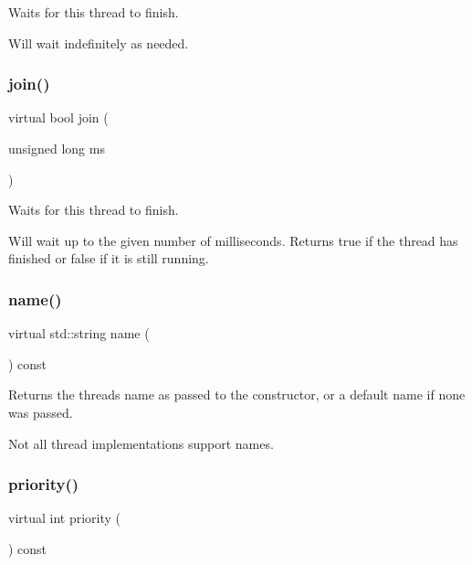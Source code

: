 Waits for this thread to finish. 

Will wait indefinitely as needed. \mbox{\label{classGThread_aeaa664c96a0ace02d44fc791725550a2}} 
\subsubsection{\texorpdfstring{join()}{join()}\hspace{0.1cm}{\footnotesize\ttfamily [2/2]}}
{\footnotesize\ttfamily virtual bool join (\begin{DoxyParamCaption}\item[{unsigned long}]{ms }\end{DoxyParamCaption})\hspace{0.3cm}{\ttfamily [pure virtual]}}



Waits for this thread to finish. 

Will wait up to the given number of milliseconds. Returns true if the thread has finished or false if it is still running. \mbox{\label{classGThread_a7f04e718c6856c4d3d77a496b6acad0d}} 
\subsubsection{\texorpdfstring{name()}{name()}}
{\footnotesize\ttfamily virtual std\+::string name (\begin{DoxyParamCaption}{ }\end{DoxyParamCaption}) const\hspace{0.3cm}{\ttfamily [pure virtual]}}



Returns the thread\textquotesingle{}s name as passed to the constructor, or a default name if none was passed. 

Not all thread implementations support names. \mbox{\label{classGThread_afefd48fe4270e6c5f2ec4c129080bfde}} 
\subsubsection{\texorpdfstring{priority()}{priority()}}
{\footnotesize\ttfamily virtual int priority (\begin{DoxyParamCaption}{ }\end{DoxyParamCaption}) const\hspace{0.3cm}{\ttfamily [pure virtual]}}



